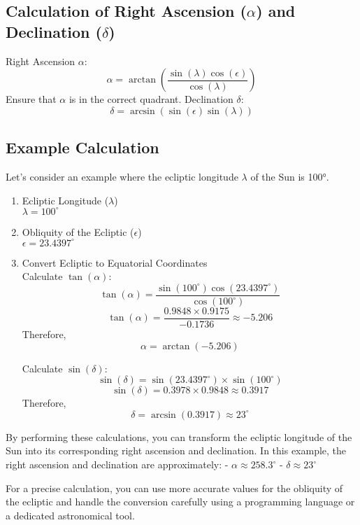 \documentclass[12pt,a4paper]{article}
\begin{document}
	\subsection{Calculation of Right Ascension (\(\alpha\)) and Declination (\(\delta\))}
	Right Ascension \(\alpha\):
	\[
	\alpha = \arctan \left( \frac{\sin(\lambda) \cos(\epsilon)}{\cos(\lambda)} \right)
	\]
	Ensure that \(\alpha\) is in the correct quadrant.
	Declination \(\delta\):
	\[
	\delta = \arcsin (\sin(\epsilon) \sin(\lambda))
	\]
	
	\subsection{Example Calculation} 
	
	Let’s consider an example where the ecliptic longitude \(\lambda\) of the Sun is 100°.
	
	\begin{enumerate}
	\item Ecliptic Longitude (\(\lambda\)) \\
		\(\lambda = 100^\circ\)
	\item Obliquity of the Ecliptic (\(\epsilon\)) \\
		\(\epsilon = 23.4397^\circ\)
		
	\item Convert Ecliptic to Equatorial Coordinates \\
		Calculate \(\tan(\alpha)\):
		\[
		\tan(\alpha) = \frac{\sin(100^\circ) \cos(23.4397^\circ)}{\cos(100^\circ)}
		\]
		\[
		\tan(\alpha) = \frac{0.9848 \times 0.9175}{-0.1736} \approx -5.206
		\]
		Therefore,
		\[
		\alpha = \arctan(-5.206)
		\]
		
		Calculate \(\sin(\delta)\):
		\[
		\sin(\delta) = \sin(23.4397^\circ) \times \sin(100^\circ)
		\]
		\[
		\sin(\delta) = 0.3978 \times 0.9848 \approx 0.3917
		\]
		Therefore,
		\[
		\delta = \arcsin(0.3917) \approx 23^\circ
		\]
	\end{enumerate}
	
	By performing these calculations, you can transform the ecliptic longitude of the Sun into its corresponding right ascension and declination. In this example, the right ascension and declination are approximately:
	- \(\alpha \approx 258.3^\circ\)
	- \(\delta \approx 23^\circ\)
	
	For a precise calculation, you can use more accurate values for the obliquity of the ecliptic and handle the conversion carefully using a programming language or a dedicated astronomical tool.
	
\end{document}
